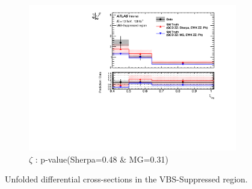 \begin{figure}[!htb]
\begin{subfigure}{.49\textwidth}
        \includegraphics[width=.98\linewidth]{figures/Results/CrossSection_VBSSuppressed/xs_centrality_CR.pdf}
        \caption{ \footnotesize{$\zeta$ }: p-value(Sherpa=0.48 $\&$ MG=0.31)}
    \end{subfigure}
    \caption{Unfolded differential cross-sections in the VBS-Suppressed region.}  \label{fig:unfolded_xs_VBS_Suppressed_b}
\end{figure}